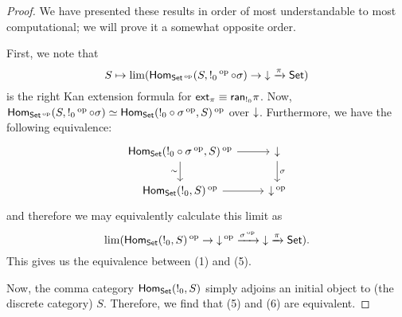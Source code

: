 \begin{proof}
We have presented these results in order of most understandable to most
computational; we will prove it a somewhat opposite order.

First, we note that 
$$S \mapsto \lim(\Hom_{\Set\op}(S, !_0\op \circ \sigma) \to \down \xto{\pi} \Set)$$
is the right Kan extension formula for $\ext_{\pi} \equiv
\term{ran}_{!_0} \pi$. Now,
$\Hom_{\Set\op}(S, !_0\op \circ \sigma) \simeq \Hom_{\Set}(!_0 \circ \sigma\op,
S)\op$ over $\down$. Furthermore, we have the following equivalence:
\[
\begin{tikzcd}
{\Hom_{\Set}(!_0 \circ \sigma\op, S)\op} \arrow[d, "\sim"'] \arrow[r] & \down \arrow[d, "\sigma"] \\
{\Hom_{\Set}(!_0, S)\op} \arrow[r]                                    & \down\op                 
\end{tikzcd}
\]
and therefore we may equivalently calculate this limit as 
$$\lim(\Hom_{\Set}(!_0, S)\op \to \down\op \xto{\sigma\op} \down \xto{\pi} \Set).$$
This gives us the equivalence between (1) and (5).

Now, the comma category $\Hom_{\Set}(!_0, S)$ simply adjoins an initial object
to (the discrete category) $S$. Therefore, we find that (5) and (6) are equivalent.


\end{proof}
